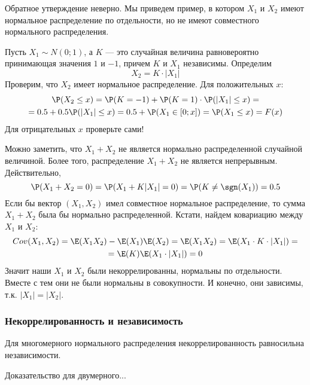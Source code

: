 Обратное утверждение неверно. Мы приведем пример, в котором $X_{1}$ и $X_{2}$ имеют нормальное распределение по отдельности, но не имеют совместного нормального распределения.

\begin{myex}
Пусть $X_{1}\sim N(0;1)$, а $K$ --- это случайная величина равновероятно принимающая значения $1$ и $-1$, причем $K$ и $X_{1}$ независимы. Определим
\begin{equation}
X_{2}=K\cdot |X_{1}|
\end{equation}
Проверим, что $X_{2}$ имеет нормальное распределение. Для положительных $x$:
\begin{multline}
\P(X_{2}\leq x)=\P(K=-1)+\P(K=1)\cdot \P(|X_{1}|\leq x)=\\
=0.5+0.5\P(|X_{1}|\leq x)=0.5+\P(X_{1}\in [0;x])=\P(X_{1}\leq x)=F(x)
\end{multline}
Для отрицательных $x$ проверьте сами!

Можно заметить, что $X_{1}+X_{2}$ не является нормально распределенной случайной величиной. Более того, распределение $X_{1}+X_{2}$ не является непрерывным. Действительно,
\begin{equation}
\P(X_{1}+X_{2}=0)=\P(X_{1}+K|X_{1}|=0)=\P(K\neq \sgn(X_{1}))=0.5
\end{equation}
Если бы вектор $(X_{1}, X_{2})$ имел совместное нормальное распределение, то сумма $X_{1}+X_{2}$ была бы нормально распределенной.
Кстати, найдем ковариацию между $X_{1}$ и $X_{2}$:
\begin{multline}
Cov(X_{1},X_{2})=\E(X_{1}X_{2})-\E(X_{1})\E(X_{2})=\E(X_{1}X_{2})=\E(X_{1}\cdot K\cdot|X_{1}|)=\\
=\E(K)\E(X_{1}\cdot |X_{1}|)=0
\end{multline}
Значит наши $X_{1}$ и $X_{2}$ были некоррелированны, нормальны по отдельности. Вместе с тем они не были нормальны в совокупности. И конечно, они зависимы, т.к. $|X_{1}|=|X_{2}|$.

\end{myex}


\subsubsection*{Некоррелированность и независимость}

Для многомерного нормального распределения некоррелированность равносильна независимости.

Доказательство для двумерного...





